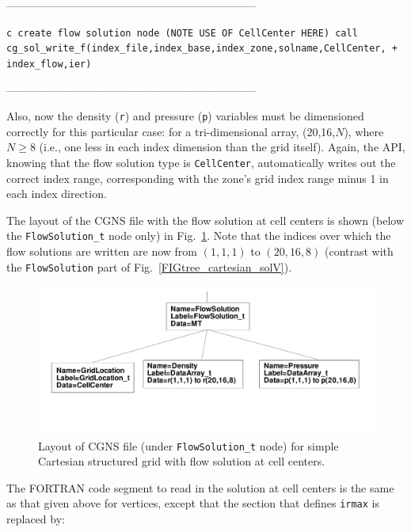 \documentclass[12pt]{article}
\begin{document}
--------------------------------------------------------------------

{\tt \noindent c  create flow solution node (NOTE USE OF CellCenter HERE)
\newline\indent      call cg\_sol\_write\_f(index\_file,index\_base,index\_zone,solname,CellCenter,
\newline + \indent index\_flow,ier)}

--------------------------------------------------------------------

\noindent Also, now the density ({\tt r}) and pressure
({\tt p}) variables must be dimensioned
correctly for this particular case:  for a tri-dimensional array,
(20,16,$N$), where $N \geq 8$
(i.e., one less in each index dimension than the grid itself).
Again, the API, knowing that the flow solution type is
{\tt CellCenter}, automatically writes out the correct index
range, corresponding with the zone's grid index range minus 1 in
each index direction.

The layout of the CGNS file with the flow
solution at cell centers is shown (below the
{\tt FlowSolution\_t} node only) in Fig.~\ref{FIGtree_cartesian_solC}.
Note that the indices over which the flow solutions are written
are now from $(1,1,1)$ to $(20,16,8)$ (contrast with 
the {\tt FlowSolution} part of Fig.~\ref{FIGtree_cartesian_solV}).

\begin{figure}[hpbt]
\centerline{{\includegraphics[width=150mm]{figures/tree_cartesian_solC}}}
\caption{Layout of CGNS file (under {\tt FlowSolution\_t} node)
for simple Cartesian structured grid with flow solution at cell
centers.}
\label{FIGtree_cartesian_solC}
\end{figure}
%

The FORTRAN code segment to read in the solution at cell centers
is the same as that given above for vertices, except that the section that
defines {\tt irmax} is replaced by:
\end{document}
